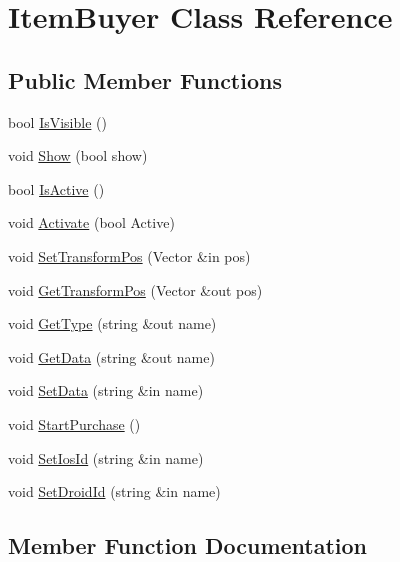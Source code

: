 \hypertarget{class_item_buyer}{}\section{Item\+Buyer Class Reference}
\label{class_item_buyer}
\subsection*{Public Member Functions}
\begin{DoxyCompactItemize}
\item 
bool \hyperlink{class_item_buyer_a0ba1c6f30b104ea4d5ebaf6d0cf5756e}{Is\+Visible} ()
\item 
void \hyperlink{class_item_buyer_ac21a4b32aa87d9f5686cac9f75144a74}{Show} (bool show)
\item 
bool \hyperlink{class_item_buyer_a580f7035e12b6a6f109a0aa995115174}{Is\+Active} ()
\item 
void \hyperlink{class_item_buyer_a8dfa30eea1820013ec3d6fb40444266c}{Activate} (bool Active)
\item 
void \hyperlink{class_item_buyer_a00ef3bcc525128ea02ea433735b2a214}{Set\+Transform\+Pos} (Vector \&in pos)
\item 
void \hyperlink{class_item_buyer_aa642c313d7f7a00302345ef86e32b77d}{Get\+Transform\+Pos} (Vector \&out pos)
\item 
void \hyperlink{class_item_buyer_aa224607cfd2d9726eeb03a819cd4ff5b}{Get\+Type} (string \&out name)
\item 
void \hyperlink{class_item_buyer_a238ef01cd2cc59e841301aadd1437e29}{Get\+Data} (string \&out name)
\item 
void \hyperlink{class_item_buyer_a8ba56bb2a91a492712bd278b14e8001b}{Set\+Data} (string \&in name)
\item 
void \hyperlink{class_item_buyer_a74d2fbbfb6fc81924e4e53d3e82abb1b}{Start\+Purchase} ()
\item 
void \hyperlink{class_item_buyer_a2152ce6e0481e0c69ca79613bfaa206f}{Set\+Ios\+Id} (string \&in name)
\item 
void \hyperlink{class_item_buyer_a5ad47ea4f8f30521cfea78a2c8ddab0e}{Set\+Droid\+Id} (string \&in name)
\end{DoxyCompactItemize}


\subsection{Member Function Documentation}
\hypertarget{class_item_buyer_a8dfa30eea1820013ec3d6fb40444266c}{}\label{class_item_buyer_a8dfa30eea1820013ec3d6fb40444266c} 
